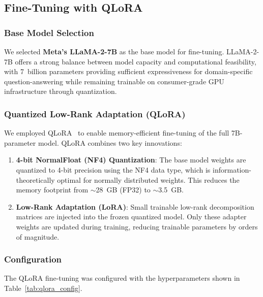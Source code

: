 \documentclass[conference,compsoc]{IEEEtran}
\begin{document}
\subsection{Fine-Tuning with QLoRA}

\subsubsection{Base Model Selection}

We selected \textbf{Meta's LLaMA-2-7B} as the base model for fine-tuning. LLaMA-2-7B offers a strong balance between model capacity and computational feasibility, with 7~billion parameters providing sufficient expressiveness for domain-specific question-answering while remaining trainable on consumer-grade GPU infrastructure through quantization.

\subsubsection{Quantized Low-Rank Adaptation (QLoRA)}

We employed QLoRA~\cite{dettmers2023qlora} to enable memory-efficient fine-tuning of the full 7B-parameter model. QLoRA combines two key innovations:

\begin{enumerate}
    \item \textbf{4-bit NormalFloat (NF4) Quantization}: The base model weights are quantized to 4-bit precision using the NF4 data type, which is information-theoretically optimal for normally distributed weights. This reduces the memory footprint from ${\sim}$28~GB (FP32) to ${\sim}$3.5~GB.
    \item \textbf{Low-Rank Adaptation (LoRA)}: Small trainable low-rank decomposition matrices are injected into the frozen quantized model. Only these adapter weights are updated during training, reducing trainable parameters by orders of magnitude.
\end{enumerate}

\subsubsection{Configuration}

The QLoRA fine-tuning was configured with the hyperparameters shown in Table~\ref{tab:qlora_config}.
\end{document}
